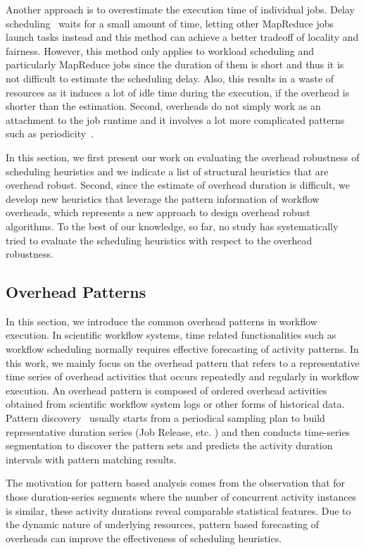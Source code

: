 Another approach is to overestimate the execution time of individual jobs. Delay scheduling~\cite{Zaharia2010} waits for a small amount of time, letting other MapReduce jobs launch tasks instead and this method can achieve a better tradeoff of locality and fairness. However, this method only applies to workload scheduling and particularly MapReduce jobs since the duration of them is short and thus it is not difficult to estimate the scheduling delay. Also, this results in a waste of resources as it induces a lot of idle time during the execution, if the overhead is shorter than the estimation. Second, overheads do not simply work as an attachment to the job runtime and it involves a lot more complicated patterns such as periodicity~\cite{Chen2011}. 

In this section, we first present our work on evaluating the overhead robustness of scheduling heuristics and we indicate a list of structural heuristics that are overhead robust. Second, since the estimate of overhead duration is difficult, we develop new heuristics that leverage the pattern information of workflow overheads, which represents a new approach to design overhead robust algorithms. To the best of our knowledge, so far, no study has systematically tried to evaluate the scheduling heuristics with respect to the overhead robustness.  



\subsection{Overhead Patterns}

In this section, we introduce the common overhead patterns in workflow execution. 
In scientific workflow systems, time related functionalities such as workflow scheduling normally requires effective forecasting of activity patterns. In this work, we mainly focus on the overhead pattern that refers to a representative time series of overhead activities that occurs repeatedly and regularly in workflow execution. An overhead pattern is composed of ordered overhead activities obtained from scientific workflow system logs or other forms of historical data. 
Pattern discovery~\cite{Liu2008} usually starts from a periodical sampling plan to build representative duration series (Job Release, etc. ) and then conducts time-series segmentation to discover the pattern sets and predicts the activity duration intervals with pattern matching results. 


The motivation for pattern based analysis comes from the observation that for those duration-series segments where the number of concurrent activity instances is similar, these activity durations reveal comparable statistical features. Due to the dynamic nature of underlying resources, pattern based forecasting of overheads can improve the effectiveness of scheduling heuristics. 

